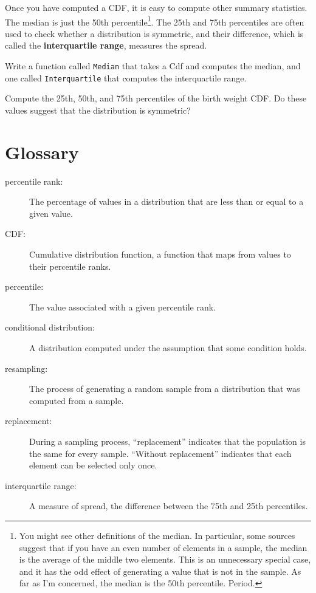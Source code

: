 \documentclass[12pt]{book}
\begin{document}
Once you have computed a CDF, it is easy to compute other summary
statistics.  The median is just the 50th percentile\footnote{You might
see other definitions of the median.  In particular,
some sources suggest that if you have an even number of elements in
a sample, the median is the average of the middle two elements.
This is an unnecessary special case, and it has the odd effect of
generating a value that is not in the sample.  As far
as I'm concerned, the median is the 50th percentile.  Period.}.
The 25th and 75th percentiles are often used to check whether
a distribution is symmetric, and their difference, which is called
the {\bf interquartile range}, measures the spread.

\begin{ex}

Write a function called {\tt Median} that takes a Cdf and computes the
median, and one called {\tt Interquartile} that computes
the interquartile range.

Compute the 25th, 50th, and 75th percentiles of the birth weight
CDF.  Do these values suggest that the distribution is symmetric?

\end{ex}


\section{Glossary}

\begin{description}

\item[percentile rank:] The percentage of values in a distribution that are
less than or equal to a given value.

\item[CDF:] Cumulative distribution function, a function that maps
  from values to their percentile ranks.

\item[percentile:] The value associated with a given percentile rank.

\item[conditional distribution:] A distribution computed under the assumption
that some condition holds.

\item[resampling:] The process of generating a random sample from a
distribution that was computed from a sample.

\item[replacement:] During a sampling process, ``replacement'' indicates
that the population is the same for every sample.  ``Without replacement''
indicates that each element can be selected only once.

\item[interquartile range:] A measure of spread, the difference between
the 75th and 25th percentiles.

\end{description}
\end{document}
